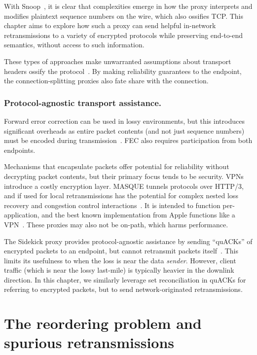 With Snoop~\cite{balakrishnan1995snoop}, it is clear
that complexities emerge in how the proxy interprets
and modifies plaintext sequence numbers on the wire, which also ossifies TCP.
This chapter aims to explore how such a proxy can send helpful in-network
retransmissions to a variety of encrypted protocols while preserving
end-to-end semantics, without access to such information.

These types of approaches make unwarranted assumptions about
transport headers ossify the protocol~\cite{papastergiou2017deossifying}.
By making reliability guarantees to the endpoint, the connection-splitting
proxies also fate share with the connection.

\subsubsection{Protocol-agnostic transport assistance.}

Forward error correction can be used in lossy environments, but this
introduces significant overheads as entire packet contents (and not just
sequence numbers) must be encoded during transmission~\cite
{rfc9265}. FEC also requires participation from both endpoints.

Mechanisms that encapsulate packets offer potential for reliability without
decrypting packet contents, but their primary focus tends to be security. VPNs
introduce a costly encryption layer. MASQUE tunnels protocols over HTTP/3, and
if used for local retransmissions has the potential for complex nested loss
recovery and congestion control interactions~\cite
{rfc9298,schinazi-masque-proxy-05,kramer2021masquepep}. It is intended to
function per-application, and the best known implementation from Apple
functions like a VPN~\cite{icloud-private-relay}. These proxies may also not be
on-path, which harms performance.

The Sidekick proxy provides protocol-agnostic assistance by sending
``quACKs'' of encrypted packets to an endpoint, but cannot retransmit
packets itself~\cite{yuan2024sidekick}. This limits its usefulness
to when the loss is near the data \textit{sender}.
However, client traffic (which is near the lossy last-mile) is typically heavier
in the downlink direction. In this chapter, we similarly leverage set
reconciliation in quACKs for referring to encrypted packets,
but to send network-originated retransmissions.

\section{The reordering problem and spurious retransmissions}
\label{sec:packrat:problem}

